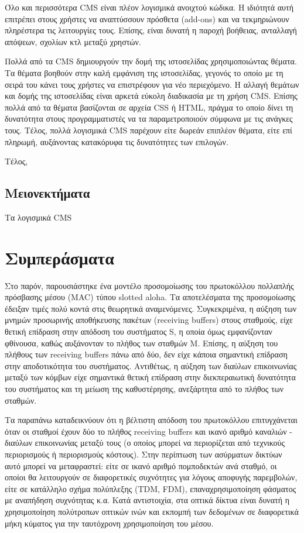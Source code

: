 \documentclass[12pt]{report}
\begin{document}
Όλο και περισσότερα \textlatin{CMS} είναι πλέον λογισμικά ανοιχτού κώδικα. Η ιδιότητά αυτή επιτρέπει στους χρήστες να αναπτύσσουν πρόσθετα (\textlatin{add-ons}) και να τεκμηριώνουν πληρέστερα τις λειτουργίες τους. Επίσης, είναι δυνατή η παροχή βοήθειας, ανταλλαγή απόψεων, σχολίων κτλ μεταξύ χρηστών.

Πολλά από τα \textlatin{CMS} δημιουργούν την δομή της ιστοσελίδας χρησιμοποιώντας θέματα. Τα θέματα βοηθούν στην καλή εμφάνιση της ιστοσελίδας, γεγονός το οποίο με τη σειρά του κάνει τους χρήστες να επιστρέφουν για νέο περιεχόμενο. Η αλλαγή θεμάτων και δομής της ιστοσελίδας είναι αρκετά εύκολη διαδικασία με τη χρήση \textlatin{CMS}. Επίσης πολλά από τα θέματα βασίζονται σε αρχεία \textlatin{CSS} ή \textlatin{HTML}, πράγμα το οποίο δίνει τη δυνατότητα στους προγραμματιστές να τα παραμετροποιούν σύμφωνα με τις ανάγκες τους. Τέλος, πολλά λογισμικά \textlatin{CMS} παρέχουν είτε δωρεάν επιπλέον θέματα, είτε επί πληρωμή, αυξάνοντας κατακόρυφα τις δυνατότητες των επιλογών.

Τέλος,

\subsection{Μειονεκτήματα}
Τα λογισμικά \textlatin{CMS} 
\section{Συμπεράσματα}
Στο παρόν, παρουσιάστηκε ένα μοντέλο προσομοίωσης του πρωτοκόλλου πολλαπλής πρόσβασης μέσου (\textlatin{MAC}) τύπου \textlatin{slotted aloha}. Τα αποτελέσματα της προσομοίωσης έδειξαν τιμές πολύ κοντά στις θεωρητικά αναμενόμενες. Συγκεκριμένα, η αύξηση των μνημών προσωρινής αποθήκευσης πακέτων (\textlatin{receiving buffers}) στους σταθμούς, είχε θετική επίδραση στην απόδοση του συστήματος \textlatin{S}, η οποία όμως εμφανίζονταν φθίνουσα, καθώς αυξάνονταν το πλήθος των σταθμών \textlatin{M}. Επίσης, η αύξηση του πλήθους των \textlatin{receiving buffers} πάνω από δύο, δεν είχε κάποια σημαντική επίδραση στην αποδοτικότητα του συστήματος. Αντιθέτως, η αύξηση των διαύλων επικοινωνίας μεταξύ των κόμβων είχε σημαντικά θετική επίδραση στην διεκπεραιωτική δυνατότητα του συστήματος και τη μείωση της καθυστέρησης, ανεξάρτητα από το πλήθος των σταθμών.

Τα παραπάνω καταδεικνύουν ότι η βέλτιστη απόδοση του πρωτοκόλλου επιτυγχάνεται όταν οι σταθμοί έχουν δύο το πλήθος \textlatin{receiving buffers} και ικανό αριθμό καναλιών - διαύλων επικοινωνίας μεταξύ τους (ο οποίος μπορεί να περιορίζεται από τεχνικούς περιορισμούς ή περιορισμούς κόστους). Στην περίπτωση των ασύρματων δικτύων αυτό μπορεί να μεταφραστεί: είτε σε ικανό αριθμό πομποδεκτών ανά σταθμό, οι οποίοι θα λειτουργούν σε διαφορετικές συχνότητες για λόγους αποφυγής παρεμβολών, είτε σε κατάλληλο σχήμα πολύπλεξης (\textlatin{TDM, FDM}), επαναχρησιμοποίηση φάσματος με αναπήδηση συχνότητας κ.α. Κατά αντιστοιχία, στα οπτικά δίκτυα είναι δυνατή η χρησιμοποίηση πολύτροπων οπτικών ινών και εκπομπή των δεδομένων σε διαφορετικά μήκη κύματος για την ταυτόχρονη χρησιμοποίηση του μέσου.

\begin{appendices}

\end{appendices}

\appendix



\end{document}

